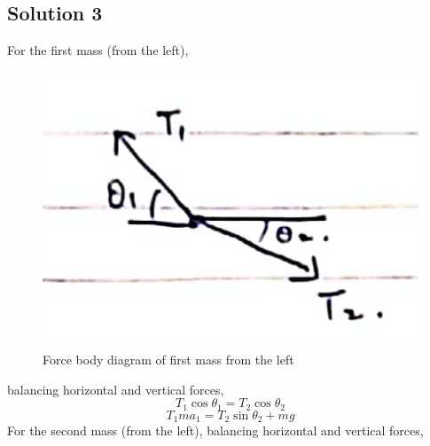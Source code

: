 \documentclass{article}
\begin{document}
\subsection{Solution 3}
For the first mass (from the left),
\begin{figure}
	\centering
	\includegraphics[width=0.5\linewidth]{spho_book_TYS_images/2010q3_2.png}
	\caption{Force body diagram of first mass from the left}
\end{figure}

balancing horizontal and vertical forces,
\[T_{1} \cos \theta_{1}=T_{2} \cos \theta_{2} \]
\[T_{1} ma_{1}=T_{2} \sin\theta_{2}+mg\]
For the second mass (from the left), balancing horizontal and vertical forces,
\end{document}
